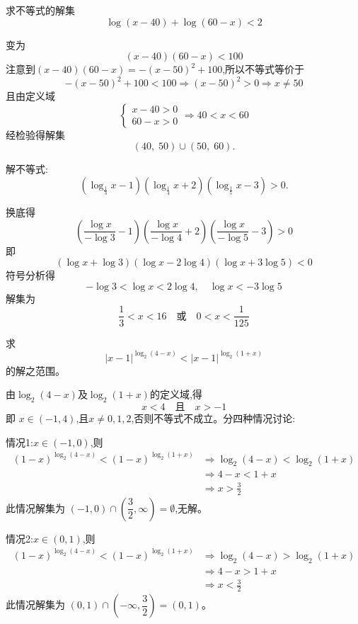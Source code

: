 \begin{questions}
    \question 求不等式的解集
    \[
    \log (x - 40) + \log (60 - x) < 2
    \]
    \begin{solution}
        变为
        \[
            (x - 40)(60 - x) < 100
        \]
        注意到\((x - 40)(60 - x) = -(x - 50)^2 + 100\),所以不等式等价于
        \[
        -(x - 50)^2 + 100 < 100 \Rightarrow (x - 50)^2 > 0\Rightarrow x \ne 50
        \]
        且由定义域\[
        \begin{cases}
        x - 40 > 0 \\
        60 - x > 0
        \end{cases} \Rightarrow 40<x<60
        \]经检验得解集
        \[
        (40,\;50)\cup(50,\;60).
        \]
    \end{solution}

    \question 解不等式:
    \[
    \left(\log_{\frac{1}{3}} x - 1\right)\left(\log_{\frac{1}{4}} x + 2\right)\left(\log_{\frac{1}{5}} x - 3\right) > 0.
    \]
    \begin{solution}
    换底得
    \[
    \left(\frac{\log x}{-\log 3} - 1\right)\left(\frac{\log x}{-\log 4} + 2\right)\left(\frac{\log x}{-\log 5} - 3\right) > 0
    \]
    即
    \[
    (\log x + \log 3)(\log x - 2\log 4)(\log x + 3\log 5) < 0
    \]
    符号分析得
    \[
    -\log 3 < \log x < 2\log 4, \quad \log x < -3\log 5
    \]
    解集为
    \[
    \frac{1}{3} < x < 16 \quad \text{或} \quad 0 < x < \frac{1}{125}
    \]
    \end{solution}

    \question 求 
    \[
    |x - 1|^{\log_{2}(4 - x)} < |x - 1|^{\log_{2}(1 + x)}
    \]
    的解之范围。
    \begin{solution}
        由$\log_{2}(4 - x)$及$\log_{2}(1 + x)$的定义域,得
        \[  
        x < 4 \quad \text{且} \quad x > -1 
        \]
        即  $x \in (-1, 4)$,且$x \neq 0,1,2$,否则不等式不成立。分四种情况讨论:

        情况1:$x \in (-1, 0)$,则
        \begin{align*}
        (1-x)^{\log_2 (4-x)} < (1-x)^{\log_2 (1+x)} & \Rightarrow \log_2 (4-x) < \log_2 (1+x) \\
        & \Rightarrow 4-x < 1+x \\
        & \Rightarrow x > \frac{3}{2}
        \end{align*}
        此情况解集为 $(-1, 0) \cap \left(\dfrac{3}{2}, \infty\right) = \emptyset$,无解。

        情况2:$x \in (0, 1)$,则
        \begin{align*}
        (1-x)^{\log_2 (4-x)} < (1-x)^{\log_2 (1+x)} & \Rightarrow \log_2 (4-x) > \log_2 (1+x) \\
        & \Rightarrow 4-x > 1+x \\
        & \Rightarrow x < \frac{3}{2} 
        \end{align*}
        此情况解集为 $(0, 1) \cap \left(-\infty, \dfrac{3}{2}\right) = (0, 1)$。


\end{solution}
\end{questions}

